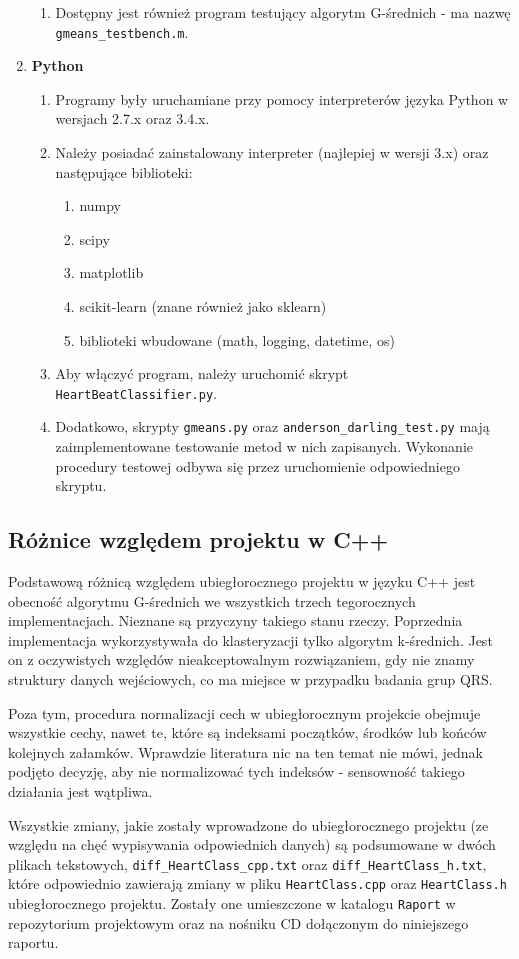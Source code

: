 \begin{enumerate}
\begin{enumerate}
		\item Dostępny jest również program testujący algorytm G-średnich - ma nazwę \texttt{gmeans\_testbench.m}.
	\end{enumerate}
	\item \textbf{Python}
	\begin{enumerate}
		\item Programy były uruchamiane przy pomocy interpreterów języka Python w wersjach 2.7.x oraz 3.4.x.
		\item Należy posiadać zainstalowany interpreter (najlepiej w wersji 3.x) oraz następujące biblioteki:
		\begin{enumerate}
			\item numpy
			\item scipy
			\item matplotlib
			\item scikit-learn (znane również jako sklearn)
			\item biblioteki wbudowane (math, logging, datetime, os)
		\end{enumerate}
		\item Aby włączyć program, należy uruchomić skrypt \texttt{HeartBeatClassifier.py}.
		\item Dodatkowo, skrypty \texttt{gmeans.py} oraz \texttt{anderson\_darling\_test.py} mają zaimplementowane testowanie metod w nich zapisanych. Wykonanie procedury testowej odbywa się przez uruchomienie odpowiedniego skryptu.
	\end{enumerate}
\end{enumerate}

\subsection{Różnice względem projektu w C++}
\label{sub:roznice_c++}

\qquad Podstawową różnicą względem ubiegłorocznego projektu w języku C++ jest obecność algorytmu G-średnich we wszystkich trzech tegorocznych implementacjach. Nieznane są przyczyny takiego stanu rzeczy. Poprzednia implementacja wykorzystywała do klasteryzacji tylko algorytm k-średnich. Jest on z oczywistych względów nieakceptowalnym rozwiązaniem, gdy nie znamy struktury danych wejściowych, co ma miejsce w przypadku badania grup QRS.

Poza tym, procedura normalizacji cech w ubiegłorocznym projekcie obejmuje wszystkie cechy, nawet te, które są indeksami początków, środków lub końców kolejnych załamków. Wprawdzie literatura nic na ten temat nie mówi, jednak podjęto decyzję, aby nie normalizować tych indeksów - sensowność takiego działania jest wątpliwa. 

Wszystkie zmiany, jakie zostały wprowadzone do ubiegłorocznego projektu (ze względu na chęć wypisywania odpowiednich danych) są podsumowane w dwóch plikach tekstowych, \texttt{diff\_HeartClass\_cpp.txt} oraz \texttt{diff\_HeartClass\_h.txt}, które odpowiednio zawierają zmiany w pliku \texttt{HeartClass.cpp} oraz \texttt{HeartClass.h} ubiegłorocznego projektu. Zostały one umieszczone w katalogu \texttt{Raport} w repozytorium projektowym oraz na nośniku CD dołączonym do niniejszego raportu.